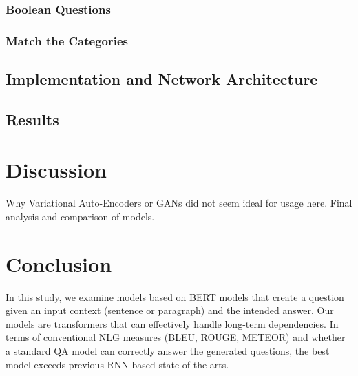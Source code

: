 \documentclass[oneside,a4paper]{article}
\begin{document}
\subsubsection{Boolean Questions}

\subsubsection{Match the Categories}

\subsection{Implementation and Network Architecture}

\subsection{Results}

\section{Discussion}
Why Variational Auto-Encoders or GANs did not seem ideal for usage here.
Final analysis and comparison of models.

\section{Conclusion}
In this study, we examine models based on BERT models that create a question given an input context (sentence or paragraph) and the intended answer. Our models are transformers that can effectively handle long-term dependencies. In terms of conventional NLG measures (BLEU, ROUGE, METEOR) and whether a standard QA model can correctly answer the generated questions, the best model exceeds previous RNN-based state-of-the-arts.
\end{document}
